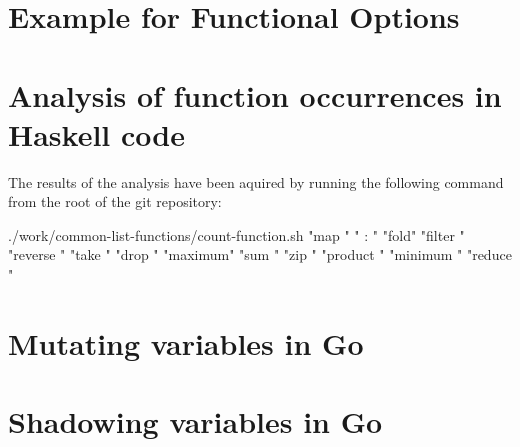 \section{Example for Functional Options}\label{appendix:funcopts}
\begin{code}
\end{code}

\section{Analysis of function occurrences in Haskell code}\label{appendix:function-occurrences}
The results of the analysis have been aquired by running the following command
from the root of the git repository\cite{git-repo}:
\begin{bashcode}
./work/common-list-functions/count-function.sh "map " " : " "fold" "filter " "reverse " "take " "drop " "maximum" "sum " "zip " "product " "minimum " "reduce "
\end{bashcode}

\section{Mutating variables in Go}\label{appendix:mutation}
\begin{code}
\end{code}

\section{Shadowing variables in Go}\label{appendix:shadowing}
\begin{code}
\end{code}

